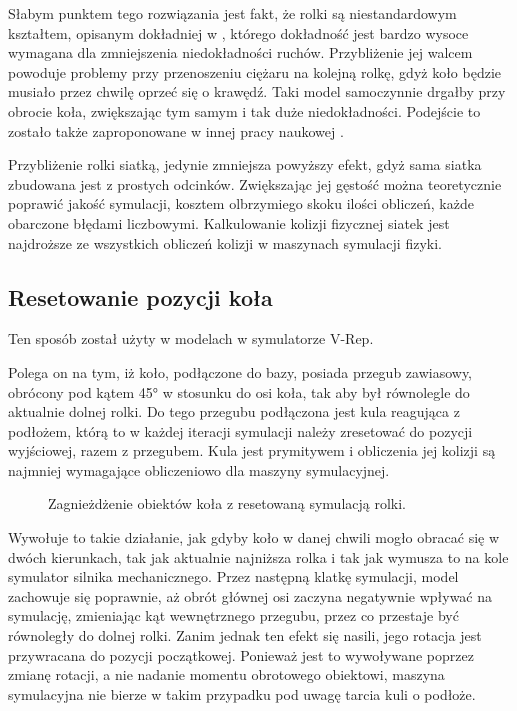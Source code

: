 		Słabym punktem tego rozwiązania jest fakt, że rolki są niestandardowym kształtem, opisanym dokładniej w \cite{rollers}, 
		którego dokładność jest bardzo wysoce wymagana dla zmniejszenia niedokładności ruchów.
		Przybliżenie jej walcem powoduje problemy przy przenoszeniu ciężaru na kolejną rolkę, gdyż koło będzie musiało przez chwilę oprzeć się o krawędź.
		Taki model samoczynnie drgałby przy obrocie koła, zwiększając tym samym i tak duże niedokładności. 
		Podejście to zostało także zaproponowane w innej pracy naukowej \cite{modelling_ways}.

		Przybliżenie rolki siatką, jedynie zmniejsza powyższy efekt, gdyż sama siatka zbudowana jest z prostych odcinków.
		Zwiększając jej gęstość można teoretycznie poprawić jakość symulacji, kosztem olbrzymiego skoku ilości obliczeń, każde obarczone błędami liczbowymi.
		Kalkulowanie kolizji fizycznej siatek jest najdroższe ze wszystkich obliczeń kolizji w maszynach symulacji fizyki.

	\subsection{Resetowanie pozycji koła}
		Ten sposób został użyty w modelach w symulatorze V-Rep.

		Polega on na tym, iż koło, podłączone do bazy, posiada przegub zawiasowy, obrócony pod kątem 45° w stosunku do osi koła, tak aby był równolegle do aktualnie dolnej rolki.
		Do tego przegubu podłączona jest kula reagująca z podłożem, którą to w każdej iteracji symulacji należy zresetować do pozycji wyjściowej, razem z przegubem.
		Kula jest prymitywem i obliczenia jej kolizji są najmniej wymagające obliczeniowo dla maszyny symulacyjnej.

		\begin{figure}[H]
		\caption{Zagnieżdżenie obiektów koła z resetowaną symulacją rolki.}
		\label{fig:vrep_wheel}
		\end{figure}

		Wywołuje to takie działanie, jak gdyby koło w danej chwili mogło obracać się w dwóch kierunkach, tak jak aktualnie najniższa rolka i tak jak wymusza to na kole 
		symulator silnika mechanicznego.
		Przez następną klatkę symulacji, model zachowuje się poprawnie, aż obrót głównej osi zaczyna negatywnie wpływać na symulację,
		zmieniając kąt wewnętrznego przegubu, przez co przestaje być równoległy do dolnej rolki.
		Zanim jednak ten efekt się nasili, jego rotacja jest przywracana do pozycji początkowej.
		Ponieważ jest to wywoływane poprzez zmianę rotacji, a nie nadanie momentu obrotowego obiektowi, 
		maszyna symulacyjna nie bierze w takim przypadku pod uwagę tarcia kuli o podłoże. 

